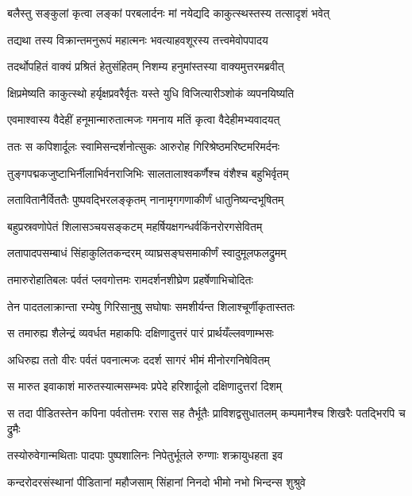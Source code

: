 \twolineshloka
{बलैस्तु सङ्कुलां कृत्वा लङ्कां परबलार्दनः}
{मां नयेद्यदि काकुत्स्थस्तस्य तत्सादृशं भवेत्} %

\twolineshloka
{तद्यथा तस्य विक्रान्तमनुरूपं महात्मनः}
{भवत्याहवशूरस्य तत्त्वमेवोपपादय} %

\twolineshloka
{तदर्थोपहितं वाक्यं प्रश्रितं हेतुसंहितम्}
{निशम्य हनुमांस्तस्या वाक्यमुत्तरमब्रवीत्} %

\twolineshloka
{क्षिप्रमेष्यति काकुत्स्थो हर्यृक्षप्रवरैर्वृतः}
{यस्ते युधि विजित्यारीञ्शोकं व्यपनयिष्यति} %

\twolineshloka
{एवमाश्वास्य वैदेहीं हनूमान्मारुतात्मजः}
{गमनाय मतिं कृत्वा वैदेहीमभ्यवादयत्} %

\twolineshloka
{ततः स कपिशार्दूलः स्वामिसन्दर्शनोत्सुकः}
{आरुरोह गिरिश्रेष्ठमरिष्टमरिमर्दनः} %

\twolineshloka
{तुङ्गपद्मकजुष्टाभिर्नीलाभिर्वनराजिभिः}
{सालतालाश्वकर्णैश्च वंशैश्च बहुभिर्वृतम्} %

\twolineshloka
{लतावितानैर्विततैः पुष्पवद्भिरलङ्कृतम्}
{नानामृगगणाकीर्णं धातुनिष्यन्दभूषितम्} %

\twolineshloka
{बहुप्रस्रवणोपेतं शिलासञ्चयसङ्कटम्}
{महर्षियक्षगन्धर्वकिंनरोरगसेवितम्} %

\twolineshloka
{लतापादपसम्बाधं सिंहाकुलितकन्दरम्}
{व्याघ्रसङ्घसमाकीर्णं स्वादुमूलफलद्रुमम्} %

\twolineshloka
{तमारुरोहातिबलः पर्वतं प्लवगोत्तमः}
{रामदर्शनशीघ्रेण प्रहर्षेणाभिचोदितः} %

\twolineshloka
{तेन पादतलाक्रान्ता रम्येषु गिरिसानुषु}
{सघोषाः समशीर्यन्त शिलाश्चूर्णीकृतास्ततः} %

\twolineshloka
{स तमारुह्य शैलेन्द्रं व्यवर्धत महाकपिः}
{दक्षिणादुत्तरं पारं प्रार्थयँल्लवणाम्भसः} %

\twolineshloka
{अधिरुह्य ततो वीरः पर्वतं पवनात्मजः}
{ददर्श सागरं भीमं मीनोरगनिषेवितम्} %

\twolineshloka
{स मारुत इवाकाशं मारुतस्यात्मसम्भवः}
{प्रपेदे हरिशार्दूलो दक्षिणादुत्तरां दिशम्} %

\threelineshloka
{स तदा पीडितस्तेन कपिना पर्वतोत्तमः}
{ररास सह तैर्भूतैः प्राविशद्वसुधातलम्}
{कम्पमानैश्च शिखरैः पतद्भिरपि च द्रुमैः} %

\twolineshloka
{तस्योरुवेगान्मथिताः पादपाः पुष्पशालिनः}
{निपेतुर्भूतले रुग्णाः शक्रायुधहता इव} %

\twolineshloka
{कन्दरोदरसंस्थानां पीडितानां महौजसाम्}
{सिंहानां निनदो भीमो नभो भिन्दन्स शुश्रुवे} %

